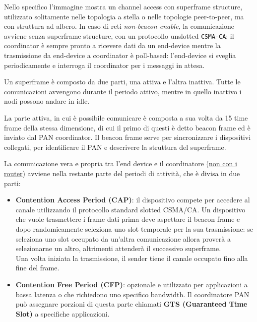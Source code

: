 Nello specifico l'immagine mostra un channel access con superframe structure, utilizzato solitamente nelle topologia a stella o nelle topologie peer-to-peer, ma con struttura ad albero.
In caso di reti \textit{non-beacon enable}, la comunicazione avviene senza superframe structure, con un protocollo unslotted \texttt{CSMA-CA};
il coordinator è sempre pronto a ricevere dati da un end-device mentre la trasmissione da end-device a coordinator è poll-based: l'end-device si sveglia periodicamente e interroga il coordinator per i messaggi in attesa.

Un superframe è composto da due parti, una attiva e l'altra inattiva. 
Tutte le comunicazioni avvengono durante il periodo attivo, mentre in quello inattivo i nodi possono andare in idle.  

La parte attiva, in cui è possibile comunicare è composta a sua volta da 15 time frame della stessa dimensione, di cui il primo di questi è detto beacon frame ed è inviato dal PAN coordinator. 
Il beacon frame serve per sincronizzare i dispositivi collegati, per identificare il PAN e descrivere la struttura del superframe. 

La comunicazione vera e propria tra l'end device e il coordinatore (\ul{non con i router}) avviene nella restante parte del periodi di attività, che è divisa in due parti:

\begin{itemize}
\item \textbf{Contention Access Period (CAP)}: il dispositivo compete per accedere al canale utilizzando il protocollo standard slotted CSMA/CA. 
Un dispositivo che vuole trasmettere i frame dati prima deve aspettare il beacon frame e dopo randomicamente seleziona uno slot temporale per la sua trasmissione: se seleziona uno slot occupato da un'altra comunicazione allora proverà a selezionarne un altro, altrimenti attenderà il successivo superframe.\\
Una volta iniziata la trasmissione, il sender tiene il canale occupato fino alla fine del frame.

\item \textbf{Contention Free Period (CFP)}: opzionale e utilizzato per applicazioni a bassa latenza o che richiedono uno specifico bandwidth. Il coordinatore PAN può assegnare porzioni di questa parte chiamati \textbf{GTS (Guaranteed Time Slot)} a specifiche applicazioni.
\end{itemize}

